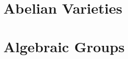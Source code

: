 \documentclass[sectionlevel=book]{noteformyself}
\begin{document}
    \chapter{Abelian Varieties}
        
        

    \chapter{Algebraic Groups}
        
        



    \printbibliography[heading=bibintoc, title={References}]
    
\end{document}
